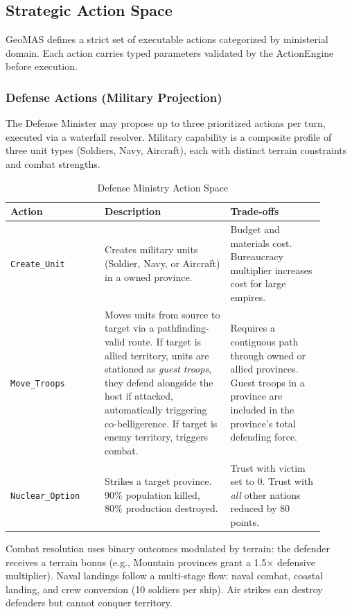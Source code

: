 \subsection{Strategic Action Space}
\label{sec:action_space}
GeoMAS defines a strict set of executable actions categorized by ministerial domain. Each action carries typed parameters validated by the ActionEngine before execution.

\subsubsection{Defense Actions (Military Projection)}
The Defense Minister may propose up to three prioritized actions per turn, executed via a waterfall resolver. Military capability is a composite profile of three unit types (Soldiers, Navy, Aircraft), each with distinct terrain constraints and combat strengths.

\begin{table}[H]
\centering
\begin{tabular}{|p{0.27\linewidth}|p{0.36\linewidth}|p{0.27\linewidth}|}
\hline
\textbf{Action} & \textbf{Description} & \textbf{Trade-offs} \\ \hline
\texttt{Create\_Unit} & Creates military units (Soldier, Navy, or Aircraft) in a owned province. & Budget and materials cost. Bureaucracy multiplier increases cost for large empires. \\ \hline
\texttt{Move\_Troops} & Moves units from source to target via a pathfinding-valid route. If target is allied territory, units are stationed as \textit{guest troops}, they defend alongside the host if attacked, automatically triggering co-belligerence. If target is enemy territory, triggers combat. & Requires a contiguous path through owned or allied provinces. Guest troops in a province are included in the province's total defending force. \\ \hline
\texttt{Nuclear\_Option} & Strikes a target province. 90\% population killed, 80\% production destroyed. & Trust with victim set to 0. Trust with \textit{all} other nations reduced by 80 points. \\ \hline
\end{tabular}
\caption{Defense Ministry Action Space}
\label{tab:defense_actions}
\end{table}

Combat resolution uses binary outcomes modulated by terrain: the defender receives a terrain bonus (e.g., Mountain provinces grant a 1.5$\times$ defensive multiplier). Naval landings follow a multi-stage flow: naval combat, coastal landing, and crew conversion (10 soldiers per ship). Air strikes can destroy defenders but cannot conquer territory.

